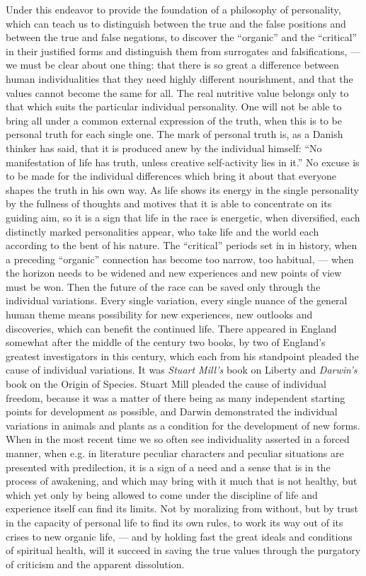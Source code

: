 \documentclass[12pt,a4paper,openany]{book}
\newcommand{\opage}[1]{\marginnote{\footnotesize\textit{[#1]}}}
\begin{document}
Under this endeavor to provide
the foundation of a philosophy of personality, which can teach us to distinguish
between the true and the false positions and between the
true and false negations, to discover the ``organic'' and
the ``critical'' in their justified forms and distinguish them from
surrogates and falsifications, --- we must be clear about
one thing: that there is so great a difference between human
individualities that they need highly different nourishment,
and that the values cannot become the same for all. The
real nutritive value belongs only to that which suits the particular
individual personality. One will not be able to bring all under
a common external expression of the truth, when this
is to be personal truth for each single one. The mark
of personal truth is, as a Danish thinker has
said, that it is produced anew by the individual himself: ``No
manifestation of life has truth, unless creative
self-activity lies in it.'' No excuse is to be made for the
individual differences which bring it about that everyone shapes
the truth in his own way. As life shows its energy
in the single personality by the fullness of thoughts and
motives that it is able to concentrate on its guiding
aim, so it is a sign that life in the race is
energetic, when diversified, each distinctly marked
personalities appear, who take life and the world each
according to the bent of his nature. The ``critical'' periods set in
in history, when a preceding ``organic'' connection
has become too narrow, too habitual, --- when the horizon needs
to be widened and new experiences and new points of view must be
\opage{242}won. Then the future of the race can be saved only through the
individual variations. Every single variation, every single
nuance of the general human theme means possibility
for new experiences, new outlooks and discoveries, which can
benefit the continued life. There appeared in England
somewhat after the middle of the century two books, by two of
England's greatest investigators in this century, which each from
his standpoint pleaded the cause of individual variations. It
was \emph{Stuart Mill's} book on Liberty and \emph{Darwin's} book on the Origin
of Species. Stuart Mill pleaded the cause of individual
freedom, because it was a matter of there being as many
independent starting points for development as possible, and
Darwin demonstrated the individual variations in animals and
plants as a condition for the development of new forms.
When in the most recent time we so often see individuality
asserted in a forced manner, when e.g. in
literature peculiar characters and peculiar situations are presented with
predilection, it is a sign of a need and a
sense that is in the process of awakening, and which may bring
with it much that is not healthy, but which yet only by
being allowed to come under the discipline of life and experience itself
can find its limits. Not by moralizing from without,
but by trust in the capacity of personal life to find its
own rules, to work its way out of its crises to new
organic life, --- and by holding fast the great ideals and
conditions of spiritual health, will it succeed in saving the
true values through the purgatory of criticism and the apparent
dissolution.
\end{document}

